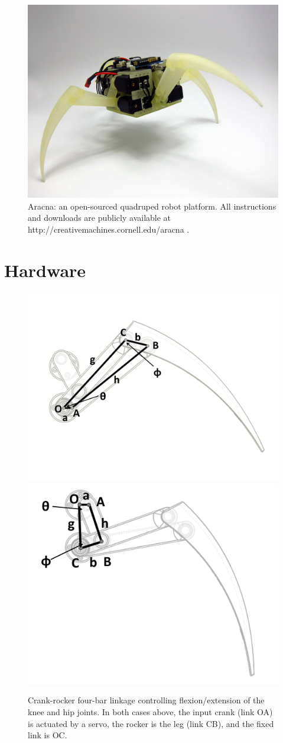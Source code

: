 \documentclass[letterpaper]{article}
\begin{document}
\begin{figure}[t]
\begin{center}
\includegraphics[width=.45\textwidth]{fig1.jpg}
\caption{Aracna: an open-sourced quadruped robot platform. All
  instructions and downloads are publicly available at
  http://creativemachines.cornell.edu/aracna .}
\label{fig1}
\end{center}
\end{figure}



\section{Hardware}

\begin{figure}[t]
\begin{center}
\includegraphics[width=.23\textwidth]{fig3.pdf}
\includegraphics[width=.23\textwidth]{fig4.pdf}
\caption{Crank-rocker four-bar linkage controlling flexion/extension of
  the knee and hip joints. In both cases above, the input crank (link
  OA) is actuated by a servo, the rocker is the leg (link CB), and the
  fixed link is OC.}
\label{fig3}
\end{center}
\end{figure}

\end{document}
